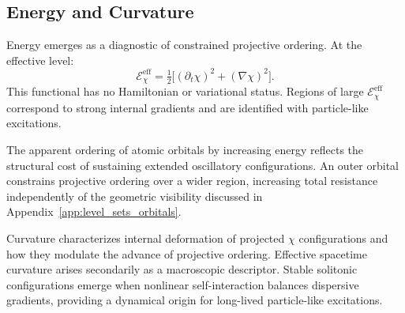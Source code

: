 \subsection{Energy and Curvature}
  \label{subsec:energy-and-curvature}

  Energy emerges as a diagnostic of constrained projective ordering.
  At the effective level:
  \[
    \mathcal{E}_\chi^{\mathrm{eff}}
    = \tfrac{1}{2}
    \bigl[
      (\partial_t\chi)^2 + (\nabla\chi)^2
      \bigr].
  \]
  This functional has no Hamiltonian or variational status.
  Regions of large $\mathcal{E}_\chi^{\mathrm{eff}}$ correspond to
  strong internal gradients and are identified with particle-like
  excitations.

  The apparent ordering of atomic orbitals by increasing energy reflects
  the structural cost of sustaining extended oscillatory configurations.
  An outer orbital constrains projective ordering over a wider region,
  increasing total resistance independently of the geometric visibility
  discussed in Appendix~\ref{app:level_sets_orbitals}.

  Curvature characterizes internal deformation of projected $\chi$
  configurations and how they modulate the advance of projective ordering.
  Effective spacetime curvature arises secondarily as a macroscopic
  descriptor.
  Stable solitonic configurations emerge when nonlinear self-interaction
  balances dispersive gradients, providing a dynamical origin for
  long-lived particle-like excitations.
